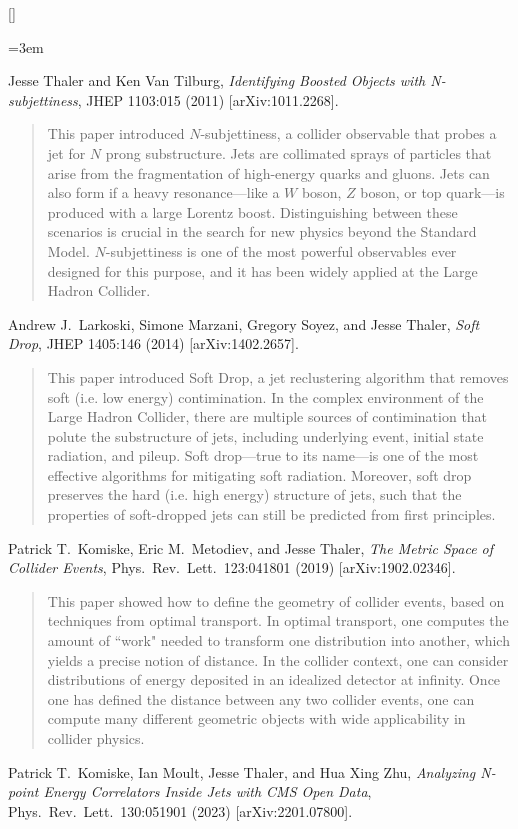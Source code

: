 \setcounter{jessecount}{1}

\begin{list}{[]\addtocounter{jessecount}{1}}{\leftmargin=3em \itemsep=4pt}

\item
 Jesse Thaler and Ken Van Tilburg,
\emph{Identifying Boosted Objects with N-subjettiness},
JHEP 1103:015 (2011)
[arXiv:1011.2268].

\begin{quote}
This paper introduced $N$-subjettiness, a collider observable that probes a jet for $N$ prong substructure.  Jets are collimated sprays of particles that arise from the fragmentation of high-energy quarks and gluons.  Jets can also form if a heavy resonance---like a $W$ boson, $Z$ boson, or top quark---is produced with a large Lorentz boost.  Distinguishing between these scenarios is crucial in the search for new physics beyond the Standard Model.  $N$-subjettiness is one of the most powerful observables ever designed for this purpose, and it has been widely applied at the Large Hadron Collider.
\end{quote}
\item
 Andrew J.\ Larkoski, Simone Marzani, Gregory Soyez, and Jesse Thaler,
\emph{Soft Drop},
JHEP 1405:146 (2014)
[arXiv:1402.2657].

\begin{quote}
This paper introduced Soft Drop, a jet reclustering algorithm that removes soft (i.e. low energy) contimination.  In the complex environment of the Large Hadron Collider, there are multiple sources of contimination that polute the substructure of jets, including underlying event, initial state radiation, and pileup.  Soft drop---true to its name---is one of the most effective algorithms for mitigating soft radiation.  Moreover, soft drop preserves the hard (i.e. high energy) structure of jets, such that the properties of soft-dropped jets can still be predicted from first principles.
\end{quote}
\item
 Patrick T.\ Komiske, Eric M.\ Metodiev, and Jesse Thaler,
\emph{The Metric Space of Collider Events},
Phys.\ Rev.\ Lett.\ 123:041801 (2019)
[arXiv:1902.02346].

\begin{quote}
This paper showed how to define the geometry of collider events, based on techniques from optimal transport.  In optimal transport, one computes the amount of ``work" needed to transform one distribution into another, which yields a precise notion of distance.  In the collider context, one can consider distributions of energy deposited in an idealized detector at infinity.  Once one has defined the distance between any two collider events, one can compute many different geometric objects with wide applicability in collider physics.
\end{quote}
\item
 Patrick T.\ Komiske, Ian Moult, Jesse Thaler, and Hua Xing Zhu,
\emph{Analyzing N-point Energy Correlators Inside Jets with CMS Open Data},
Phys.\ Rev.\ Lett.\ 130:051901 (2023)
[arXiv:2201.07800].


\end{list}
